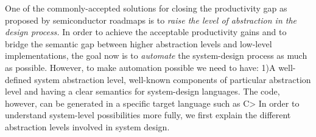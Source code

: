 One of the commonly-accepted solutions for closing the productivity gap as proposed by semiconductor roadmaps is to \emph{raise the level of abstraction in the design process.}
In order to achieve the acceptable productivity gains and to bridge the semantic gap between higher abstraction levels and low-level implementations, the goal now is to \emph{automate} the system-design process as much as possible.
However, to make automation possible we need to have: 1)A well-defined system abstraction level, well-known components of particular abstraction level and having a clear semantics for system-design languages.
The code, however, can be generated in a specific target language such as C>
In order to understand system-level possibilities more fully, we first explain the different abstraction levels involved in system design.
